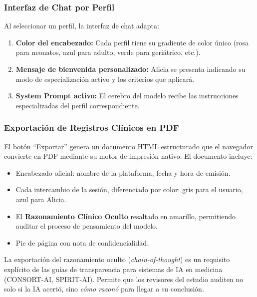 \documentclass[12pt,a4paper]{article}
\begin{document}
\subsubsection{Interfaz de Chat por Perfil}

Al seleccionar un perfil, la interfaz de chat adapta:
\begin{enumerate}
  \item \textbf{Color del encabezado:} Cada perfil tiene su gradiente de color único (rosa para
    neonatos, azul para adulto, verde para geriátrico, etc.).
  \item \textbf{Mensaje de bienvenida personalizado:} Alicia se presenta indicando su modo de
    especialización activo y los criterios que aplicará.
  \item \textbf{System Prompt activo:} El cerebro del modelo recibe las instrucciones
    especializadas del perfil correspondiente.
\end{enumerate}

\subsubsection{Exportación de Registros Clínicos en PDF}

El botón ``Exportar'' genera un documento HTML estructurado que el navegador convierte en PDF
mediante su motor de impresión nativo. El documento incluye:

\begin{itemize}
  \item Encabezado oficial: nombre de la plataforma, fecha y hora de emisión.
  \item Cada intercambio de la sesión, diferenciado por color: gris para el usuario, azul para
    Alicia.
  \item El \textbf{Razonamiento Clínico Oculto} resaltado en amarillo, permitiendo auditar el
    proceso de pensamiento del modelo.
  \item Pie de página con nota de confidencialidad.
\end{itemize}

\begin{successbox}
  La exportación del razonamiento oculto (\textit{chain-of-thought}) es un requisito explícito
  de las guías de transparencia para sistemas de IA en medicina (CONSORT-AI, SPIRIT-AI). Permite
  que los revisores del estudio auditen no solo si la IA acertó, sino \textit{cómo razonó} para
  llegar a su conclusión.
\end{successbox}
\end{document}
